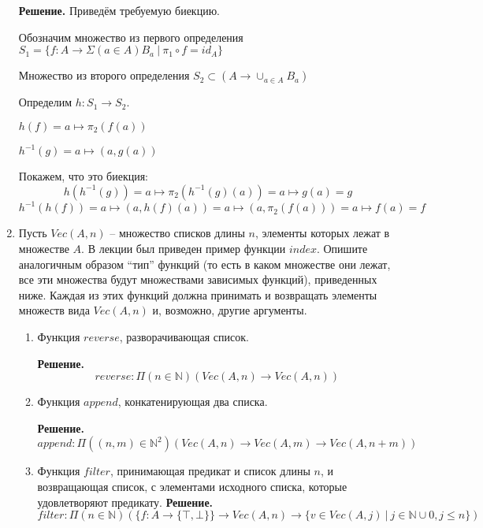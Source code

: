 \begin{enumerate}
\textbf{Решение.} Приведём требуемую биекцию. 

Обозначим множество из первого определения $S_1 = \{f:A\rightarrow \Sigma(a\in A) B_a \ \big| 
\ \pi_1\circ f = id_A \}$

Множество из второго определения $S_2 \subset (A \rightarrow \cup_{a \in A} B_a)$

Определим $h:S_1 \rightarrow S_2$. 

$h(f) = a \mapsto \pi_2(f(a))$

$h^{-1}(g) = a \mapsto (a, g(a))$

Покажем, что это биекция:
$$h(h^{-1}(g)) = a \mapsto \pi_2(h^{-1}(g)(a)) = a \mapsto g(a) = g$$
$$h^{-1}(h(f)) = a \mapsto (a, h(f)(a)) = a \mapsto (a, \pi_2(f(a))) = a \mapsto f(a) = f$$

\item \label{it:vec}
    Пусть $Vec(A,n)$ -- множество списков длины $n$, элементы которых лежат в множестве $A$.
    В лекции был приведен пример функции $index$.
    Опишите аналогичным образом ``тип'' функций (то есть в каком множестве они лежат, все эти множества будут множествами зависимых функций), приведенных ниже.
    Каждая из этих функций должна принимать и возвращать элементы множеств вида $Vec(A,n)$ и, возможно, другие аргументы.
\begin{enumerate}
\item Функция $reverse$, разворачивающая список.

\textbf{Решение.} $$reverse : \Pi(n \in \mathbb{N}) (Vec(A, n) \rightarrow Vec(A, n)) $$

\item Функция $append$, конкатенирующая два списка.

\textbf{Решение.} $$append : \Pi((n,m) \in \mathbb{N}^2) (Vec(A, n) \rightarrow Vec(A, m) 
\rightarrow Vec(A, n + m)) $$

\item Функция $filter$, принимающая предикат и список длины $n$, и возвращающая список, с 
элементами исходного списка, которые удовлетворяют предикату.
\textbf{Решение.} $$filter : \Pi(n \in \mathbb{N}) (\{f:A\rightarrow \{\top, \bot\}\} \rightarrow Vec(A, n) \rightarrow \{v \in Vec(A, j) \ \big| \ j \in \mathbb{N}\cup {0}, j \leqslant n\}) $$
\end{enumerate}


\end{enumerate}
